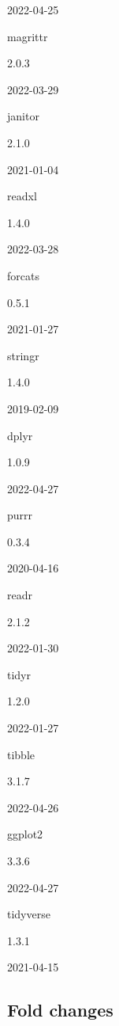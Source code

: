 \documentclass[9pt,lineno]{elife}
\begin{document}
\begin{landscape}
\begin{landscape}
2022-04-25

magrittr

2.0.3

2022-03-29

janitor

2.1.0

2021-01-04

readxl

1.4.0

2022-03-28

forcats

0.5.1

2021-01-27

stringr

1.4.0

2019-02-09

dplyr

1.0.9

2022-04-27

purrr

0.3.4

2020-04-16

readr

2.1.2

2022-01-30

tidyr

1.2.0

2022-01-27

tibble

3.1.7

2022-04-26

ggplot2

3.3.6

2022-04-27

tidyverse

1.3.1

2021-04-15

\clearpage

\hypertarget{sup-foldchanges}{%
\subsection{Fold changes}\label{sup-foldchanges}}

\begin{landscape}\begingroup\fontsize{5}{7}\selectfont


\end{landscape}
\end{landscape}
\end{landscape}
\end{document}
